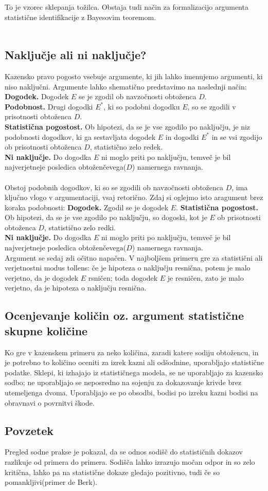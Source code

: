 \documentclass[a4paper,12pt]{article}
\begin{document}
To je vzorec sklepanja tožilca. Obstaja tudi način za formalizacijo argumenta statistične identifikacije z Bayesovim teoremom. \\\\

\subsection{Naključje ali ni naključje?}
Kazensko pravo pogosto vsebuje argumente, ki jih lahko imenujemo argumenti, ki niso naključni. Argumente lahko shematično predstavimo 
na naslednji način:
\textbf{Dogodek.} Dogodek $E$ se je zgodil ob navzočnosti obtoženca $D$.\\
\textbf{Podobnost.} Drugi dogodki $E^{*}$, ki so podobni dogodku $E$, so se zgodili v prisotnosti obtoženca $D$.\\
\textbf{Statistična pogostost.} Ob hipotezi, da se je vse zgodilo po naključju, je niz podobnosti dogodkov, ki ga sestavljata dogodek $E$ in 
dogodki $E^{*}$ in se vsi zgodijo ob prisotnosti obtoženca $D$, statistično zelo redek.\\
\textbf{Ni naključje.} Do dogodka $E$ ni moglo priti po naključju, temveč je bil najverjetneje posledica obtoženčevega($D$) namernega ravnanja.\\\\

Obstoj podobnih dogodkov, ki so se zgodili ob navzočnosti obtoženca $D$, ima ključno vlogo v argumentaciji, vsaj retorično. Zdaj si oglejmo isto 
aragument brez koraka podobnosti:
\textbf{Dogodek.} Zgodil se je dogodek $E$.
\textbf{Statistična pogostost.} Ob hipotezi, da se je vse zgodilo po naključju, so dogoski, kot je $E$ ob prisotnosti obtoženca $D$, statistično zelo 
redki.\\
\textbf{Ni naključje.} Do dogodka $E$ ni moglo priti po naključju, temveč je bil najverjetneje posledica obtoženčevega($D$) namernega ravnanja.\\
Argument se sedaj zdi očitno napačen. V najboljšem primeru gre za statistični ali verjetnostni modus tollens: če je hipoteza o naključju resnična, potem 
je malo verjetno, da je dogodek $E$ rsničen; toda dogodek $E$ je resničen, zato je malo verjetno, da je hipoteza o naključju resnična. 

\subsection{Ocenjevanje količin oz. argument statistične skupne količine}
Ko gre v kazenskem primeru za neko količina, zaradi katere sodiju obtožencu, in je potrebno to količino oceniti za izrek kazni ali odšodnine, uporabljajo 
statistične podatke. Sklepi, ki izhajajo iz statističnega modela, se ne uporabljajo za kazensko sodbo; ne uporabljajo se neposredno na sojenju za dokazovanje krivde 
brez utemeljenga dvoma. Uporabljajo se po obsodbi, bodisi po izreku kazni bodisi na obravnavi o povrnitvi škode.

\subsection{Povzetek}
Pregled sodne prakse je pokazal, da se odnos sodišč do statističnih dokazov razlikuje od primera do primera. Sodišča lahko izrazujo močan odpor in so zelo 
kritična, lahko pa na statistične dokaze gledajo pozitivno, tudi če so pomankljivi(primer de Berk).
\end{document}
